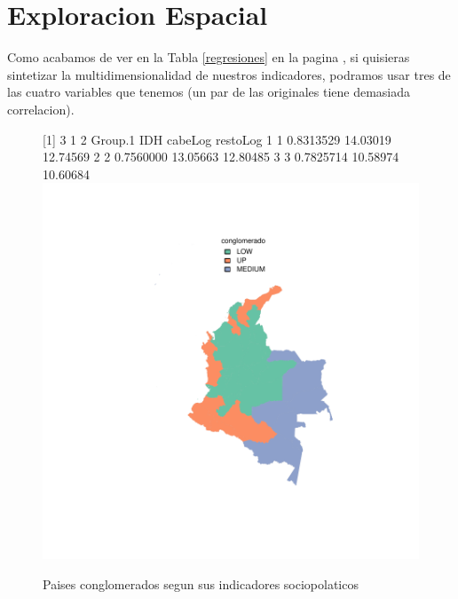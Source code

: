 \clearpage

\section{Exploracion Espacial}

Como acabamos de ver en la Tabla \ref{regresiones} en la pagina \pageref{regresiones}, si quisieras sintetizar la multidimensionalidad de nuestros indicadores, podramos usar tres de las cuatro variables que tenemos (un par de las originales tiene demasiada correlacion). 







\begin{figure}[h]
\centering
\begin{adjustbox}{width=18cm,height=14cm,clip,trim=25cm 0cm 0cm 0cm}
[1] 3 1 2  Group.1       IDH  cabeLog restoLog
1       1 0.8313529 14.03019 12.74569
2       2 0.7560000 13.05663 12.80485
3       3 0.7825714 10.58974 10.60684\includegraphics{Proyecto_Final_regresion-plotMapf}
\end{adjustbox}
\caption{Paises conglomerados segun sus indicadores sociopolaticos}\label{clustmap}
\end{figure}

\clearpage

\endinput
